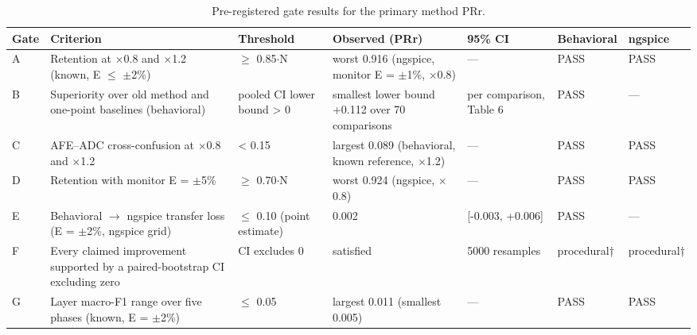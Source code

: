 \begin{table}[H]
\caption{Pre-registered gate results for the primary method PRr.\label{tab:table05_gates}}
\centering
\footnotesize
\begin{tabular}{p{3.2cm}p{1.8cm}p{1.8cm}p{1.8cm}p{1.8cm}p{1.8cm}p{1.8cm}}
\toprule
\textbf{Gate} & \textbf{Criterion} & \textbf{Threshold} & \textbf{Observed (PRr)} & \textbf{95\% CI} & \textbf{Behavioral} & \textbf{ngspice} \\
\midrule
A & Retention at $\times$0.8 and $\times$1.2 (known, E $\leq$ $\pm$2\%) & $\geq$ 0.85$\cdot$N & worst 0.916 (ngspice, monitor E = $\pm$1\%, $\times$0.8) & --- & PASS & PASS \\
B & Superiority over old method and one-point baselines (behavioral) & pooled CI lower bound > 0 & smallest lower bound +0.112 over 70 comparisons & per comparison, Table 6 & PASS & --- \\
C & AFE--ADC cross-confusion at $\times$0.8 and $\times$1.2 & < 0.15 & largest 0.089 (behavioral, known reference, $\times$1.2) & --- & PASS & PASS \\
D & Retention with monitor E = $\pm$5\% & $\geq$ 0.70$\cdot$N & worst 0.924 (ngspice, $\times$0.8) & --- & PASS & PASS \\
E & Behavioral $\rightarrow$ ngspice transfer loss (E = $\pm$2\%, ngspice grid) & $\leq$ 0.10 (point estimate) & 0.002 & [-0.003, +0.006] & PASS & --- \\
F & Every claimed improvement supported by a paired-bootstrap CI excluding zero & CI excludes 0 & satisfied & 5000 resamples & procedural† & procedural† \\
G & Layer macro-F1 range over five phases (known, E = $\pm$2\%) & $\leq$ 0.05 & largest 0.011 (smallest 0.005) & --- & PASS & PASS \\
\bottomrule
\end{tabular}
\par\vspace{2pt}
\end{table}


